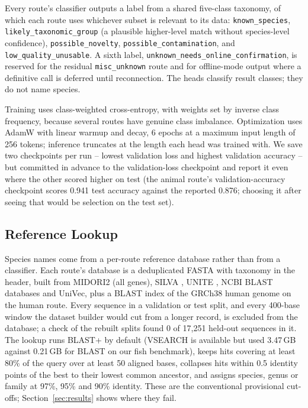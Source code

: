 \documentclass[conference]{IEEEtran}
\begin{document}
Every route's classifier outputs a label from a shared five-class taxonomy, of which each route uses whichever subset is relevant to its data: \texttt{known\_species}, \texttt{likely\_taxonomic\_group} (a plausible higher-level match without species-level confidence), \texttt{possible\_novelty}, \texttt{possible\_contamination}, and \texttt{low\_quality\_unusable}. A sixth label, \texttt{unknown\_needs\_online\_confirmation}, is reserved for the residual \texttt{misc\_unknown} route and for offline-mode output where a definitive call is deferred until reconnection. The heads classify result classes; they do not name species.

Training uses class-weighted cross-entropy, with weights set by inverse class frequency, because several routes have genuine class imbalance. Optimization uses AdamW \cite{loshchilov2019adamw} with linear warmup and decay, 6 epochs at a maximum input length of 256 tokens; inference truncates at the length each head was trained with. We save two checkpoints per run -- lowest validation loss and highest validation accuracy -- but committed in advance to the validation-loss checkpoint and report it even where the other scored higher on test (the animal route's validation-accuracy checkpoint scores 0.941 test accuracy against the reported 0.876; choosing it after seeing that would be selection on the test set).

\subsection{Reference Lookup}
\label{sec:reference}

Species names come from a per-route reference database rather than from a classifier. Each route's database is a deduplicated FASTA with taxonomy in the header, built from MIDORI2 \cite{leray2022midori2} (all genes), SILVA \cite{quast2013silva}, UNITE \cite{nilsson2019unite}, NCBI BLAST databases and UniVec, plus a BLAST index of the GRCh38 human genome on the human route. Every sequence in a validation or test split, and every 400-base window the dataset builder would cut from a longer record, is excluded from the database; a check of the rebuilt splits found 0 of 17{,}251 held-out sequences in it. The lookup runs BLAST+ \cite{camacho2009blastplus} by default (VSEARCH \cite{rognes2016vsearch} is available but used 3.47\,GB against 0.21\,GB for BLAST on our fish benchmark), keeps hits covering at least 80\% of the query over at least 50 aligned bases, collapses hits within 0.5 identity points of the best to their lowest common ancestor, and assigns species, genus or family at 97\%, 95\% and 90\% identity. These are the conventional provisional cut-offs; Section~\ref{sec:results} shows where they fail.
\end{document}
